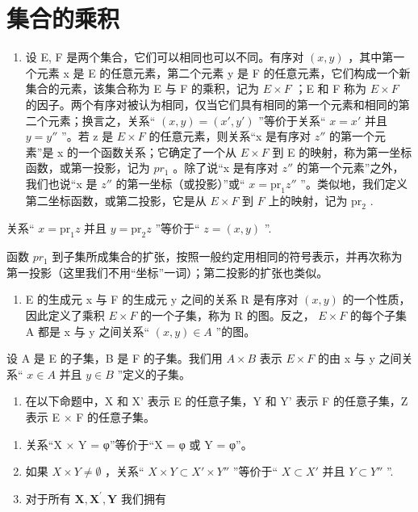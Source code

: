 \section{集合的乘积}

\begin{enumerate}
\def\labelenumi{\arabic{enumi}.}
\tightlist
\item
  设 E, F 是两个集合，它们可以相同也可以不同。有序对 \((x, y)\) ，其中第一个元素 x 是 E 的任意元素，第二个元素 y 是 F 的任意元素，它们构成一个新集合的元素，该集合称为 E 与 F 的乘积，记为 \(E \times F\) ；E 和 F 称为 \(E \times F\) 的因子。两个有序对被认为相同，仅当它们具有相同的第一个元素和相同的第二个元素；换言之，关系“ \((x, y) = (x', y')\) ''等价于关系`` \(x = x'\) 并且 \(y = y''\) ”。若 z 是 \(E \times F\) 的任意元素，则关系“x 是有序对 \(z''\) 的第一个元素”是 x 的一个函数关系；它确定了一个从 \(E \times F\) 到 E 的映射，称为第一坐标函数，或第一投影，记为 \(pr_{1}\) 。除了说“x 是有序对 \(z''\) 的第一个元素”之外，我们也说“x 是 \(z''\) 的第一坐标（或投影）”或“ \(x = \mathrm{pr}_1z''\) ”。类似地，我们定义第二坐标函数，或第二投影，它是从 \(E \times F\) 到 \(F\) 上的映射，记为 \(\mathrm{pr}_2\) .
\end{enumerate}

关系“ \(x = \text{pr}_1 z\) 并且 \(y = \text{pr}_2 z\) ”等价于“ \(z = (x, y)\) ''.

函数 \(pr_{1}\) 到子集所成集合的扩张，按照一般约定用相同的符号表示，并再次称为第一投影（这里我们不用“坐标”一词）；第二投影的扩张也类似。

\begin{enumerate}
\def\labelenumi{\arabic{enumi}.}
\setcounter{enumi}{1}
\tightlist
\item
  E 的生成元 x 与 F 的生成元 y 之间的关系 R 是有序对 \((x, y)\) 的一个性质，因此定义了乘积 \(E \times F\) 的一个子集，称为 R 的图。反之， \(E \times F\) 的每个子集 A 都是 x 与 y 之间关系“ \((x, y) \in A\) ”的图。
\end{enumerate}

设 A 是 E 的子集，B 是 F 的子集。我们用 \(A \times B\) 表示 \(E \times F\) 的由 x 与 y 之间关系“ \(x \in A\) 并且 \(y \in B\) ”定义的子集。

\begin{enumerate}
\def\labelenumi{\arabic{enumi}.}
\setcounter{enumi}{2}
\tightlist
\item
  在以下命题中，X 和 X' 表示 E 的任意子集，Y 和 Y' 表示 F 的任意子集，Z 表示 E × F 的任意子集。
\end{enumerate}

\begin{enumerate}
\def\labelenumi{(\alph{enumi})}
\item
  关系“X × Y = φ”等价于“X = φ 或 Y = φ”。
\item
  如果 \(X \times Y \neq \emptyset\) ，关系“ \(X \times Y \subset X' \times Y''\) ”等价于“ \(X \subset X'\) 并且 \(Y \subset Y''\) ''.
\item
  对于所有 \(\mathbf{X},\mathbf{X}^{\prime},\mathbf{Y}\) 我们拥有
\end{enumerate}

